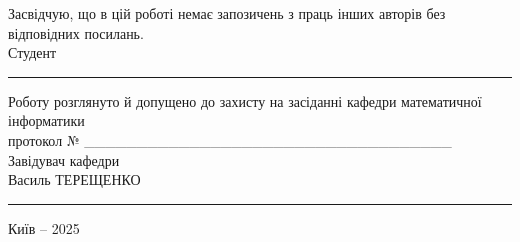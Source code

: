 \begin{titlepage}
    \vspace{1cm} %

    \begin{flushright}
      \begin{minipage}{0.6\textwidth}
          \fontsize{11}{13}\selectfont
          Засвідчую, що в цій роботі немає запозичень з праць інших авторів без відповідних посилань. \\
          Студент \hfill \rule{4cm}{0.4pt}
      \end{minipage}
    \end{flushright}


    \begin{flushright}
        \begin{minipage}{0.6\textwidth}
        Роботу розглянуто й допущено до захисту на засіданні
        кафедри математичної інформатики \\
        протокол № \_\_\_\_\_\_\_\_\_\_\_\_\_\_\_\_\_\_\_\_\_\_\_\_\_\_\_\_\_\_\_\_\_\_\_ \\
        Завідувач кафедри \\
        Василь ТЕРЕЩЕНКО
        \hfill \rule{4cm}{0.4pt}
        \end{minipage}
    \end{flushright}

    \vfill %

    {\fontsize{12}{14}\selectfont Київ – 2025\par}
    \vspace*{0.5cm} %

\end{titlepage} 